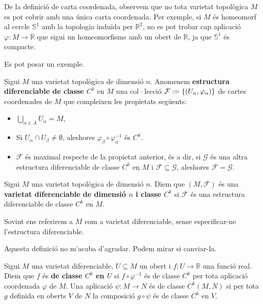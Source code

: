 \begin{obs}
    De la definició de carta coordenada, observem que no tota varietat topològica $M$ es pot cobrir amb una única carta coordenada. Per exemple, si $M$ és homeomorf al cercle $\mathbb S^1$ amb la topologia induïda per $\mathbb R^2$, no es pot trobar cap aplicació $\varphi:M\to\mathbb R$ que sigui un homeomorfisme amb un obert de $\mathbb R$, ja que $\mathbb S^1$ és compacte.
\end{obs}

{\color{blue} Es pot posar un exemple.}

\begin{defi}
    Sigui $M$ una varietat topològica de dimensió $n$. Anomenem \textbf{estructura diferenciable de classe $C^k$} en $M$ una col·lecció $\mathcal F:=\{(U_\alpha,\varphi_\alpha)\}$ de cartes coordenades de $M$ que compleixen les propietats següents:
    \begin{itemize}
        \item $\bigcup_{\alpha\in A} U_\alpha = M$,
        \item Si $U_\alpha\cap U_\beta\neq\emptyset$, aleshores $\varphi_\beta\circ\varphi_\alpha^{-1}$ és $C^k$.
        \item $\mathcal F$ és maximal respecte de la propietat anterior, és a dir, si $\mathcal G$ és una altra estructura diferenciable de classe $C^k$ en $M$ i $\mathcal F\subseteq\mathcal G$, aleshores $\mathcal F = \mathcal G$.
    \end{itemize}
\end{defi}

\begin{defi}
    Sigui $M$ una varietat topològica de dimensió $n$. Diem que $(M, \mathcal F)$ és una \textbf{varietat diferenciable de dimensió $n$ i classe $C^k$} si $\mathcal F$ és una estructura diferenciable de classe $C^k$ en $M$.
\end{defi}

\begin{nota}
    Sovint ens referirem a $M$ com a varietat diferenciable, sense especificar-ne l'estructura diferenciable.
\end{nota}

\begin{defi}
    {\color{blue} Aquesta definició no m'acaba d'agradar. Podem mirar si canviar-la.}

    Sigui $M$ una varietat diferenciable, $U\subseteq M$ un obert i $f:U\to\mathbb R$ una funció real. Diem que $f$ és \textbf{de classe $C^k$ en $U$} si $f\circ\varphi^{-1}$ és de classe $C^k$ per tota aplicació coordenada $\varphi$ de $M$.
    Una aplicació $\psi:M\to N$ és de classe $C^k(M,N)$ si per tota $g$ definida en oberts $V$ de $N$ la composició $g\circ\psi$ és de classe $C^k$ en $V$.
\end{defi}

